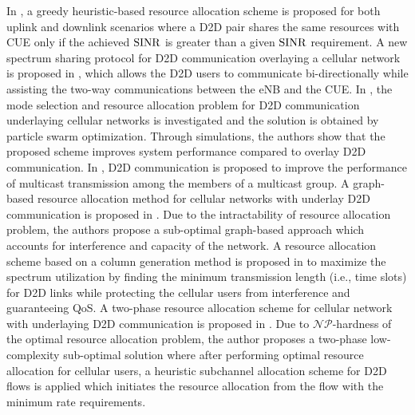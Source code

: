 \documentclass[twocolumn,10pt]{IEEEtran}
\begin{document}
In \cite{zul-d2d}, a greedy heuristic-based resource allocation scheme is proposed for both uplink and downlink scenarios where a D2D pair shares the same resources with CUE only if the achieved ${\rm SINR}$ is greater than a given ${\rm SINR}$ requirement. A new spectrum sharing protocol for D2D communication overlaying a cellular network is proposed in \cite{d2d_new_paper}, which allows the D2D users to communicate bi-directionally while assisting the two-way communications between the eNB and the CUE. In \cite{d2d_swarm}, the mode selection and resource allocation problem for D2D communication underlaying cellular networks is investigated and the solution is obtained by particle swarm optimization. Through simulations, the authors show that the proposed scheme improves system performance compared to overlay D2D communication. In \cite{d2d_multicast}, D2D communication is proposed to improve the performance of multicast transmission among the members of a multicast group.  A graph-based resource allocation method for cellular networks with underlay D2D communication is proposed in \cite{d2d_intf_graph}. Due to the intractability of resource allocation problem, the authors propose a sub-optimal graph-based approach which accounts for interference and capacity of the network. A resource allocation scheme based on a column generation method is proposed in \cite{phond-d2d} to maximize the spectrum utilization by finding the minimum transmission length (i.e., time slots) for D2D links while protecting the cellular users from interference and guaranteeing QoS. 
A two-phase resource allocation scheme for cellular
network with underlaying D2D communication is proposed in \cite{le_d2d}. Due to $\mathcal{NP}$-hardness of the optimal resource allocation problem, the author proposes a two-phase low-complexity sub-optimal solution where after performing optimal resource allocation for cellular users, a heuristic subchannel allocation scheme for D2D flows is applied which initiates the resource allocation from the flow with the minimum rate requirements. 
\end{document}
